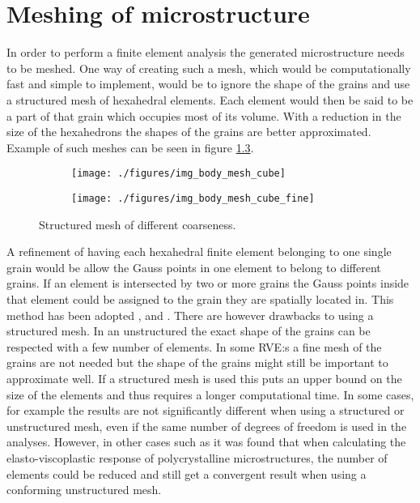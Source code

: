 \documentclass[meshing_micro.tex]{subfiles}
\begin{document}
\chapter{Meshing of microstructure}

In order to perform a finite element analysis the generated microstructure needs to be meshed. One way of creating such a mesh, which would be computationally fast and simple to implement, would be to ignore the shape of the grains and use a structured mesh of hexahedral elements. Each element would then be said to be a part of that grain which occupies most of its volume. With a reduction in the size of the hexahedrons the shapes of the grains are better approximated. Example of such meshes can be seen in figure \ref{fig:pois_voronoi_mesh_cube}.

\begin{figure}
\centering
\begin{subfigure}[b]{.5\textwidth}
  \centering
  \texttt{[image: ./figures/img\_body\_mesh\_cube]}
  \caption{}
  \label{fig:pois_voronoi_mesh_cube_a}
\end{subfigure}%
\begin{subfigure}[b]{.5\textwidth}
  \centering
  \texttt{[image: ./figures/img\_body\_mesh\_cube\_fine]}
  \caption{}
  \label{fig:pois_voronoi_mesh_cube_b}
\end{subfigure}
\caption{Structured mesh of different coarseness.}
\label{fig:pois_voronoi_mesh_cube}
\end{figure}

A refinement of having each hexahedral finite element belonging to one single grain would be allow the Gauss points in one element to belong to different grains. 
If an element is intersected by two or more grains the Gauss points inside that element could be assigned to the grain they are spatially located in. 
This method has been adopted \cite{Nygards20031049}, \cite{Cailletaud2003351} and \cite{Barbe2001513}. There are however drawbacks to using a structured mesh. 
In an unstructured the exact shape of the grains can be respected with a few number of elements. In some RVE:s a fine mesh of the grains are not needed but the shape of the grains might still be important to approximate well. If a structured mesh is used this puts an upper bound on the size of the elements and thus requires a longer computational time.
In some cases, for example \cite{Bohlke201011} the results are not significantly different when using a structured or unstructured mesh, even if the same number of degrees of freedom is used in the analyses. However, in other cases such as \cite{Li20091163} it was found that when calculating the elasto-viscoplastic response of polycrystalline microstructures, the number of elements could be reduced and still get a convergent result when using a conforming unstructured mesh. 
\end{document}
